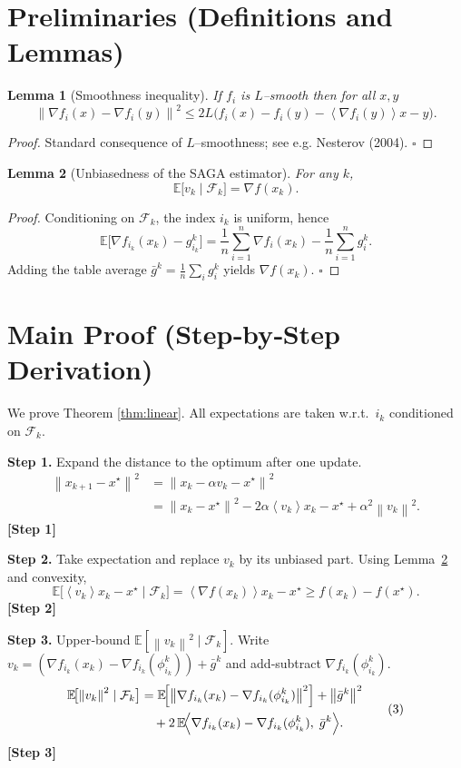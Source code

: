 \documentclass{article}
\newtheorem{lemma}{Lemma}
\newcommand{\E}{\mathbb{E}}
\newcommand{\norm}[1]{\left\|#1\right\|}
\newcommand{\inner}[1]{\left\langle #1 \right\rangle}
\begin{document}
\newpage

\section*{Preliminaries (Definitions and Lemmas)}
\begin{lemma}[Smoothness inequality]\label{lem:smooth}
If $f_i$ is $L$–smooth then for all $x,y$
\[
\norm{\nabla f_i(x)-\nabla f_i(y)}^2\le 2L\bigl(f_i(x)-f_i(y)-\inner{\nabla f_i(y)}{x-y}\bigr).
\]
\end{lemma}
\begin{proof}
Standard consequence of $L$–smoothness; see e.g. Nesterov (2004). \(\square\)
\end{proof}

\begin{lemma}[Unbiasedness of the SAGA estimator]\label{lem:unbiased}
For any $k$,
\[
\E\!\bigl[v_k\mid\mathcal{F}_k\bigr]=\nabla f(x_k).
\]
\end{lemma}
\begin{proof}
Conditioning on $\mathcal{F}_k$, the index $i_k$ is uniform, hence
\[
\E\!\bigl[\nabla f_{i_k}(x_k)-g_{i_k}^k\bigr]=\frac{1}{n}\sum_{i=1}^{n}\nabla f_i(x_k)-\frac{1}{n}\sum_{i=1}^{n}g_i^k.
\]
Adding the table average $\bar g^k=\frac{1}{n}\sum_i g_i^k$ yields $\nabla f(x_k)$. \(\square\)
\end{proof}

\section*{Main Proof (Step‑by‑Step Derivation)}
We prove Theorem \ref{thm:linear}.  
All expectations are taken w.r.t.\ $i_k$ conditioned on $\mathcal{F}_k$.

\noindent\textbf{Step 1.}  Expand the distance to the optimum after one update.
\[
\begin{aligned}
\norm{x_{k+1}-x^\star}^2 
&= \norm{x_k-\alpha v_k-x^\star}^2  \\
&= \norm{x_k-x^\star}^2-2\alpha\inner{v_k}{x_k-x^\star}+\alpha^2\norm{v_k}^2. \tag{1}
\end{aligned}
\]
\textbf{[Step 1]}

\noindent\textbf{Step 2.}  Take expectation and replace $v_k$ by its unbiased part.
Using Lemma~\ref{lem:unbiased} and convexity,
\[
\E\!\bigl[\inner{v_k}{x_k-x^\star}\mid\mathcal{F}_k\bigr]
= \inner{\nabla f(x_k)}{x_k-x^\star}
\ge f(x_k)-f(x^\star). \tag{2}
\]
\textbf{[Step 2]}

\noindent\textbf{Step 3.}  Upper‑bound $\E[\norm{v_k}^2\mid\mathcal{F}_k]$.
Write $v_k = (\nabla f_{i_k}(x_k)-\nabla f_{i_k}(\phi_{i_k}^k))
+ \bar g^k$ and add‑subtract $\nabla f_{i_k}(\phi_{i_k}^k)$.
\[
\begin{aligned}
\E\!\bigl[\norm{v_k}^2\mid\mathcal{F}_k\bigr]
&= \E\!\Bigl[\norm{\nabla f_{i_k}(x_k)-\nabla f_{i_k}(\phi_{i_k}^k)}^2\Bigr]
      +\norm{\bar g^k}^2\\
&\quad+2\,\E\!\Bigl\langle \nabla f_{i_k}(x_k)-\nabla f_{i_k}(\phi_{i_k}^k),\;\bar g^k\Bigr\rangle .
\end{aligned}
\tag{3}
\]
\textbf{[Step 3]}
\end{document}
